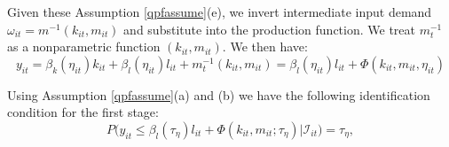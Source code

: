 \documentclass[11pt]{article}
\begin{document}
Given these Assumption \eqref{qpfassume}(e), we invert intermediate input demand $\omega_{it}=m^{-1}(k_{it}, m_{it})$ and substitute into the production function. We treat $m_{t}^{-1}$ as a nonparametric function $(k_{it}, m_{it})$. We then have:
\begin{equation} \label{qpf1st}
y_{it}=\beta_{k}(\eta_{it})k_{it}+\beta_{l}(\eta_{it})l_{it}+m_{t}^{-1}(k_{it}, m_{it})=\beta_{l}(\eta_{it})l_{it}+\Phi(k_{it}, m_{it}, \eta_{it})
\end{equation}

Using Assumption \eqref{qpfassume}(a) and (b) we have the following identification condition for the first stage:
\begin{equation} \label{1ststageident}
	P\big(y_{it}\leq \beta_{l}(\tau_{\eta})l_{it}+\Phi(k_{it}, m_{it}; \tau_{\eta})\big|\mathcal{I}_{it})=\tau_{\eta},
\end{equation}
\end{document}

